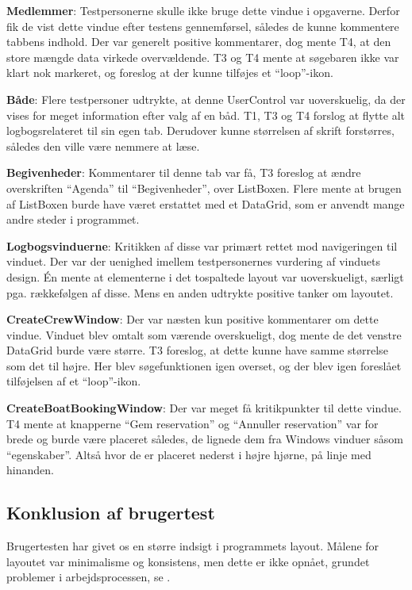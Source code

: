 \textbf{Medlemmer}:
Testpersonerne skulle ikke bruge dette vindue i opgaverne.
Derfor fik de vist dette vindue efter testens gennemførsel, således de kunne kommentere tabbens indhold. 
Der var generelt positive kommentarer, dog mente T4, at den store mængde data virkede overvældende. 
T3 og T4 mente at søgebaren ikke var klart nok markeret, og foreslog at der kunne tilføjes et ``loop''-ikon. 

\textbf{Både}:
Flere testpersoner udtrykte, at denne UserControl var uoverskuelig, da der vises for meget information efter valg af en båd.
T1, T3 og T4 forslog at flytte alt logbogsrelateret til sin egen tab.
Derudover kunne størrelsen af skrift forstørres, således den ville være nemmere at læse. 

\textbf{Begivenheder}:
Kommentarer til denne tab var få, T3 foreslog at ændre overskriften ``Agenda'' til ``Begivenheder'', over ListBoxen.
Flere mente at brugen af ListBoxen burde have været erstattet med et DataGrid, som er anvendt mange andre steder i programmet. 

\textbf{Logbogsvinduerne}:
Kritikken af disse var primært rettet mod navigeringen til vinduet. 
Der var der uenighed imellem testpersonernes vurdering af vinduets design.
Én mente at elementerne i det tospaltede layout var uoverskueligt, særligt pga. rækkefølgen af disse. 
Mens en anden udtrykte positive tanker om layoutet.

\textbf{CreateCrewWindow}:
Der var næsten kun positive kommentarer om dette vindue.
Vinduet blev omtalt som værende overskueligt, dog mente de det venstre DataGrid burde være større.
T3 foreslog, at dette kunne have samme størrelse som det til højre. 
Her blev søgefunktionen igen overset, og der blev igen foreslået tilføjelsen af et ``loop''-ikon.

\textbf{CreateBoatBookingWindow}:
Der var meget få kritikpunkter til dette vindue.
T4 mente at knapperne ``Gem reservation'' og ``Annuller reservation'' var for brede og burde være placeret således, de lignede dem fra Windows vinduer såsom ``egenskaber''. 
Altså hvor de er placeret nederst i højre hjørne, på linje med hinanden. 

\subsection{Konklusion af brugertest}
Brugertesten har givet os en større indsigt i programmets layout.
Målene for layoutet var minimalisme og konsistens, men dette er ikke opnået, grundet problemer i arbejdsprocessen, se . 

